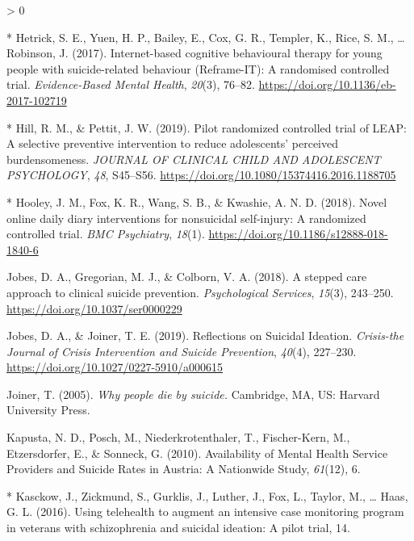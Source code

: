 \documentclass[
  english,
  man]{apa6}
\newlength{\cslhangindent}
\newenvironment{CSLReferences}[2] %
 {%
  \setlength{\parindent}{0pt}
  \ifodd #1 \everypar{\setlength{\hangindent}{\cslhangindent}}\ignorespaces\fi
  \ifnum #2 > 0
  \setlength{\parskip}{#2\baselineskip}
  \fi
 }%
 {}
\begin{document}
\begin{CSLReferences}{1}{0}
\leavevmode\hypertarget{ref-hetrick2017}{}%
* Hetrick, S. E., Yuen, H. P., Bailey, E., Cox, G. R., Templer, K., Rice, S. M., \ldots{} Robinson, J. (2017). Internet-based cognitive behavioural therapy for young people with suicide-related behaviour ({Reframe-IT}): {A} randomised controlled trial. \emph{Evidence-Based Mental Health}, \emph{20}(3), 76--82. \url{https://doi.org/10.1136/eb-2017-102719}

\leavevmode\hypertarget{ref-hill2019}{}%
* Hill, R. M., \& Pettit, J. W. (2019). Pilot randomized controlled trial of {LEAP}: {A} selective preventive intervention to reduce adolescents' perceived burdensomeness. \emph{JOURNAL OF CLINICAL CHILD AND ADOLESCENT PSYCHOLOGY}, \emph{48}, S45--S56. \url{https://doi.org/10.1080/15374416.2016.1188705}

\leavevmode\hypertarget{ref-hooley2018}{}%
* Hooley, J. M., Fox, K. R., Wang, S. B., \& Kwashie, A. N. D. (2018). Novel online daily diary interventions for nonsuicidal self-injury: {A} randomized controlled trial. \emph{BMC Psychiatry}, \emph{18}(1). \url{https://doi.org/10.1186/s12888-018-1840-6}

\leavevmode\hypertarget{ref-jobes2018}{}%
Jobes, D. A., Gregorian, M. J., \& Colborn, V. A. (2018). A stepped care approach to clinical suicide prevention. \emph{Psychological Services}, \emph{15}(3), 243--250. \url{https://doi.org/10.1037/ser0000229}

\leavevmode\hypertarget{ref-jobes2019}{}%
Jobes, D. A., \& Joiner, T. E. (2019). Reflections on {Suicidal Ideation}. \emph{Crisis-the Journal of Crisis Intervention and Suicide Prevention}, \emph{40}(4), 227--230. \url{https://doi.org/10.1027/0227-5910/a000615}

\leavevmode\hypertarget{ref-joiner2005}{}%
Joiner, T. (2005). \emph{Why people die by suicide.} {Cambridge, MA, US}: {Harvard University Press}.

\leavevmode\hypertarget{ref-kapusta2010}{}%
Kapusta, N. D., Posch, M., Niederkrotenthaler, T., Fischer-Kern, M., Etzersdorfer, E., \& Sonneck, G. (2010). Availability of {Mental Health Service Providers} and {Suicide Rates} in {Austria}: {A Nationwide Study}, \emph{61}(12), 6.

\leavevmode\hypertarget{ref-kasckow2016}{}%
* Kasckow, J., Zickmund, S., Gurklis, J., Luther, J., Fox, L., Taylor, M., \ldots{} Haas, G. L. (2016). Using telehealth to augment an intensive case monitoring program in veterans with schizophrenia and suicidal ideation: {A} pilot trial, 14.


\end{CSLReferences}
\end{document}
